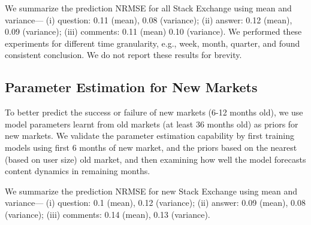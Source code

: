 We summarize the prediction NRMSE for all Stack Exchange using mean and variance--- (i) question: 0.11 (mean), 0.08 (variance); (ii) answer: 0.12 (mean), 0.09 (variance); (iii) comments: 0.11 (mean) 0.10 (variance). We performed these experiments for different time granularity, e.g., week, month, quarter, and found consistent conclusion. We do not report these results for brevity.

\subsection{Parameter Estimation for New Markets} 
To better predict the success or failure of new markets (6-12 months old), we use model parameters learnt from old markets (at least 36 months old) as priors for new markets. We validate the parameter estimation capability by first training models using first 6 months of new market, and the priors based on the nearest (based on user size) old market, and then examining how well the model forecasts content dynamics in remaining months. 

We summarize the prediction NRMSE for new Stack Exchange using mean and variance--- (i) question: 0.1 (mean), 0.12 (variance); (ii) answer: 0.09 (mean), 0.08 (variance); (iii) comments: 0.14 (mean), 0.13 (variance).

